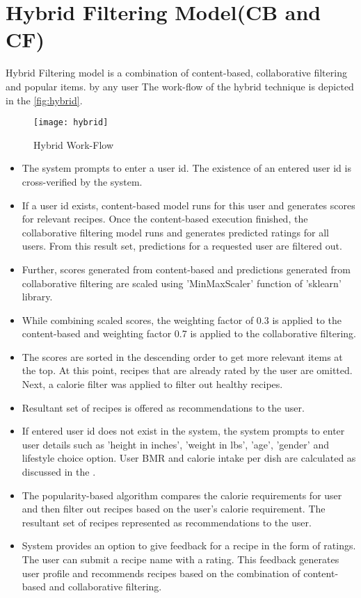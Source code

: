 \section{Hybrid Filtering Model(CB and CF)}
Hybrid Filtering model is a combination of content-based, collaborative filtering and popular items. 
by any user  The work-flow of the hybrid technique is depicted in the \autoref{fig:hybrid}.
\begin{figure}[H]
	\centering
	\texttt{[image: hybrid]}
	\caption{Hybrid Work-Flow }
	\label{fig:hybrid}
\end{figure}  
\begin{itemize}
\item The system prompts to enter a user id. The existence of an entered user id is cross-verified by the system.
\item If a user id exists, content-based model runs for this user and generates scores for relevant recipes. Once the content-based execution finished, the collaborative filtering model runs and generates predicted ratings for all users. From this result set, predictions for a requested user are filtered out. 
\item Further, scores generated from content-based and predictions generated from collaborative filtering are scaled using 'MinMaxScaler' function of 'sklearn' library.
\item While combining scaled scores, the weighting factor of 0.3 is applied to the content-based and weighting factor 0.7 is applied to the collaborative filtering.
\item The scores are sorted in the descending order to get more relevant items at the top. At this point, recipes that are already rated by the user are omitted. Next, a calorie filter was applied to filter out healthy recipes.
\item Resultant set of recipes is offered as recommendations to the user.
\item If entered user id does not exist in the system, the system prompts to enter user details such as 'height in inches', 'weight in lbs', 'age', 'gender' and lifestyle choice option. User BMR and calorie intake per dish are calculated as discussed in the . 
\item The popularity-based algorithm compares the calorie requirements for user and then filter out recipes based on the user's calorie requirement. The resultant set of recipes represented as recommendations to the user. 
\item System provides an option to give feedback for a recipe in the form of ratings. The user can submit a recipe name with a rating. This feedback generates user profile and recommends recipes based on the combination of content-based and collaborative filtering.
\end{itemize}
